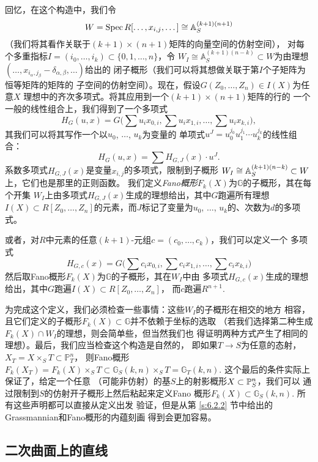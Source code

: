 回忆，在这个构造中，我们令
\[
	W=\spec R[\dots,x_{i,j},\dots]\cong \bba_S^{(k+1)(n+1)}
\]
（我们将其看作关联于$(k+1)\times (n+1)$矩阵的向量空间的仿射空间），
对每个多重指标$I=(i_0,\dots,i_k)\subset \{0,1,\dots,n\}$，令
$W_I\cong \mathbb A_S^{(k+1)(n-k)}\subset W$为由理想
$(\dots,x_{i_\alpha,j_\beta}-\delta_{\alpha,\beta},\dots)$给出的
闭子概形（我们可以将其想做关联于第$I$个子矩阵为恒等矩阵的矩阵的
子空间的仿射空间）。现在，假设$G(Z_0,\dots,Z_n)\in I(X)$为任意$X$
理想中的齐次多项式。将其应用到一个$(k+1)\times (n+1)$矩阵的行的
一个一般的线性组合上，我们得到了一个多项式
\[
	H_G(u,x)=G\bigl(\sum u_ix_{0,i},\sum u_ix_{1,i},\dots,\sum u_ix_{k,i}\bigr),
\]
其我们可以将其写作一个以$u_0$, $\dots$, $u_k$为变量的
单项式$u^J=u_0^{j_0}u_1^{j_1}\cdots u_k^{j_k}$的线性组合：
\[
	H_G(u,x)=\sum H_{G,J}(x)\cdot u^J.
\]
系数多项式$H_{G,J}(x)$是变量$x_{i,j}$的多项式，限制到子概形
$W_I\cong \A_S^{(k+1)(n-k)}\subset W$上，它们也是那里的正则函数。
我们定义\emph{Fano概形}$F_k(X)$为$\mathbb G$的子概形，其在每个开集
$W_I$上由多项式$H_{G,J}(x)$生成的理想给出，其中$G$跑遍所有理想
$I(X)\subset R[Z_0,\dots,Z_n]$的元素，而$J$标记了变量为$u_0$, $\dots$, 
$u_k$的、次数为$d$的多项式。

或者，对$R$中元素的任意$(k+1)$-元组$c=(c_0,\dots,c_k)$，我们可以定义一个
多项式
\[
	H_{G,c}(x)=G\bigl(\sum c_ix_{0,i},\sum c_ix_{1,i},\dots,\sum c_ix_{k,i}\bigr)
\]
然后取Fano概形$F_k(X)$为$\mathbb G$的子概形，其在$W_I$中由
多项式$H_{G,c}(x)$生成的理想给出，其中$G$跑遍$I(X)\subset R[Z_0,\dots,Z_n]$，
而$c$跑遍$R^{n+1}$.


为完成这个定义，我们必须检查一些事情：这些$W_I$的子概形在相交的地方
相容，且它们定义的子概形$F_k(X)\subset \mathbb G$并不依赖于坐标的选取
（若我们选择第二种生成$F_k(X)\cap W_I$的理想，则会简单些，但当然我们也
得证明两种方式产生了相同的理想）。最后，我们应当检查这个构造是自然的，
即如果$T\to S$为任意的态射，$X_T=X\times_S T\subset \mathbb P_T^n$，
则Fano概形$F_k(X_T)=F_k(X)\times_S T\subset \mathbb G_S(k,n)\times_S T
=\mathbb G_{T}(k,n)$. 这个最后的条件实际上保证了，给定一个任意
（可能非仿射）的基$S$上的射影概形$X\subset \P_S^n$，我们可以
通过限制到$S$的仿射开子概形上然后粘起来定义Fano
概形$F_k(X)\subset \mathbb G_S(k,n)$. 所有这些声明都可以直接从定义出发
验证，但是从第 \ref{s:6.2.2} 节中给出的Grassmannian和Fano概形的内蕴刻画
得到会更加容易。

\subsection{二次曲面上的直线}\label{s:4.3.2}

